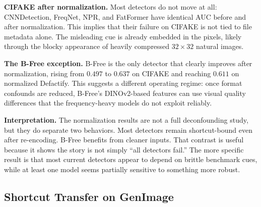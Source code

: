 \documentclass{article}
\begin{document}
\noindent\textbf{CIFAKE after normalization.}
Most detectors do not move at all: CNNDetection, FreqNet, NPR, and FatFormer have identical AUC before and after normalization.
This implies that their failure on CIFAKE is not tied to file metadata alone.
The misleading cue is already embedded in the pixels, likely through the blocky appearance of heavily compressed $32\times32$ natural images.

\noindent\textbf{The B-Free exception.}
B-Free is the only detector that clearly improves after normalization, rising from $0.497$ to $0.637$ on CIFAKE and reaching $0.611$ on normalized Defactify.
This suggests a different operating regime: once format confounds are reduced, B-Free's DINOv2-based features can use visual quality differences that the frequency-heavy models do not exploit reliably.

\noindent\textbf{Interpretation.}
The normalization results are not a full deconfounding study, but they do separate two behaviors.
Most detectors remain shortcut-bound even after re-encoding.
B-Free benefits from cleaner inputs.
That contrast is useful because it shows the story is not simply ``all detectors fail.''
The more specific result is that most current detectors appear to depend on brittle benchmark cues, while at least one model seems partially sensitive to something more robust.

\subsection{Shortcut Transfer on GenImage}
\end{document}
